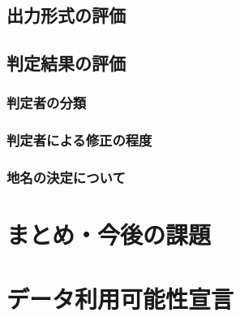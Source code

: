 \documentclass[12pt,a4paper,twocolumn,twoside]{jsik}
\begin{document}
\subsection{出力形式の評価}



\subsection{判定結果の評価}
\subsubsection{判定者の分類}





\subsubsection{判定者による修正の程度}




\subsubsection{地名の決定について}






\section{まとめ・今後の課題}


\balance
\section{データ利用可能性宣言}


\FloatBarrier

\balance


\end{document}
